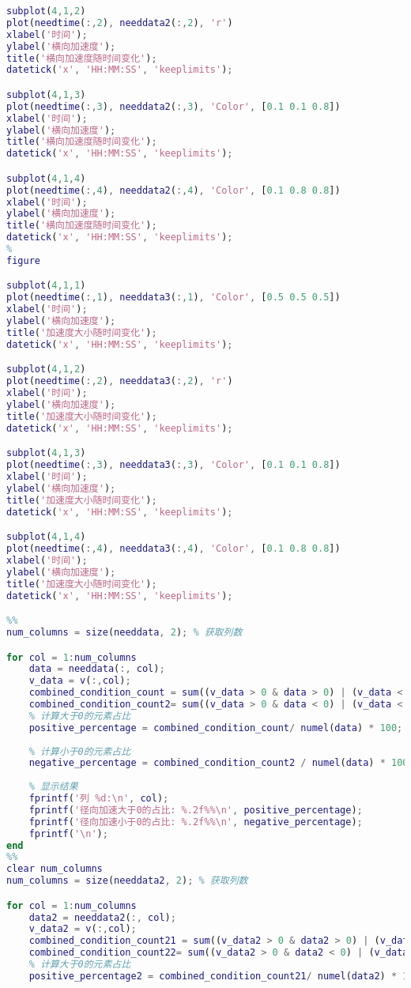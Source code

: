 \documentclass[withoutpreface,bwprint]{cumcmthesis} %
\begin{document}
\begin{appendices}
\begin{lstlisting}[language=matlab]
subplot(4,1,2)
plot(needtime(:,2), needdata2(:,2), 'r')
xlabel('时间');
ylabel('横向加速度');
title('横向加速度随时间变化');
datetick('x', 'HH:MM:SS', 'keeplimits');

subplot(4,1,3)
plot(needtime(:,3), needdata2(:,3), 'Color', [0.1 0.1 0.8])
xlabel('时间');
ylabel('横向加速度');
title('横向加速度随时间变化');
datetick('x', 'HH:MM:SS', 'keeplimits');

subplot(4,1,4)
plot(needtime(:,4), needdata2(:,4), 'Color', [0.1 0.8 0.8])
xlabel('时间');
ylabel('横向加速度');
title('横向加速度随时间变化');
datetick('x', 'HH:MM:SS', 'keeplimits');
%
figure

subplot(4,1,1)
plot(needtime(:,1), needdata3(:,1), 'Color', [0.5 0.5 0.5])
xlabel('时间');
ylabel('横向加速度');
title('加速度大小随时间变化');
datetick('x', 'HH:MM:SS', 'keeplimits');

subplot(4,1,2)
plot(needtime(:,2), needdata3(:,2), 'r')
xlabel('时间');
ylabel('横向加速度');
title('加速度大小随时间变化');
datetick('x', 'HH:MM:SS', 'keeplimits');

subplot(4,1,3)
plot(needtime(:,3), needdata3(:,3), 'Color', [0.1 0.1 0.8])
xlabel('时间');
ylabel('横向加速度');
title('加速度大小随时间变化');
datetick('x', 'HH:MM:SS', 'keeplimits');

subplot(4,1,4)
plot(needtime(:,4), needdata3(:,4), 'Color', [0.1 0.8 0.8])
xlabel('时间');
ylabel('横向加速度');
title('加速度大小随时间变化');
datetick('x', 'HH:MM:SS', 'keeplimits');

%%
num_columns = size(needdata, 2); % 获取列数

for col = 1:num_columns
    data = needdata(:, col);
    v_data = v(:,col);
    combined_condition_count = sum((v_data > 0 & data > 0) | (v_data < 0 & data < 0));%加速
    combined_condition_count2= sum((v_data > 0 & data < 0) | (v_data < 0 & data > 0));%减速
    % 计算大于0的元素占比
    positive_percentage = combined_condition_count/ numel(data) * 100;
    
    % 计算小于0的元素占比
    negative_percentage = combined_condition_count2 / numel(data) * 100;
    
    % 显示结果
    fprintf('列 %d:\n', col);
    fprintf('径向加速大于0的占比: %.2f%%\n', positive_percentage);
    fprintf('径向加速小于0的占比: %.2f%%\n', negative_percentage);
    fprintf('\n');
end
%%
clear num_columns
num_columns = size(needdata2, 2); % 获取列数

for col = 1:num_columns
    data2 = needdata2(:, col);
    v_data2 = v(:,col);
    combined_condition_count21 = sum((v_data2 > 0 & data2 > 0) | (v_data2 < 0 & data2 < 0));%加速
    combined_condition_count22= sum((v_data2 > 0 & data2 < 0) | (v_data2 < 0 & data2 > 0));%减速
    % 计算大于0的元素占比
    positive_percentage2 = combined_condition_count21/ numel(data2) * 100;
    

\end{lstlisting}
\end{appendices}
\end{document}
